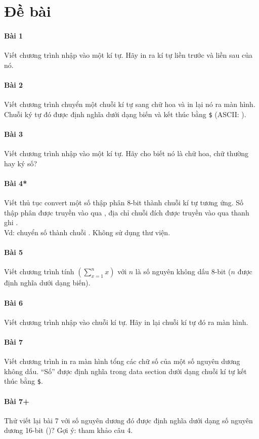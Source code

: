 \documentclass[main.tex]{subfiles}
\begin{document}
\newcommand{\textD}{\textcolor{OliveGreen}{\cd{Đ}}}
\newcommand{\textS}{\textcolor{red}{\cd{S}}}

\section{Đề bài}
\paragraph{Bài 1} Viết chương trình nhập vào một kí tự. Hãy in ra kí tự liền trước và liền sau của nó.
\paragraph{Bài 2} Viết chương trình chuyển một chuỗi kí tự sang chữ hoa và in lại nó ra màn hình. Chuỗi ký tự đó được định nghĩa dưới dạng biến và kết thúc bằng \verb#$# (ASCII: ).
\paragraph{Bài 3} Viết chương trình nhập vào một kí tự. Hãy cho biết nó là chữ hoa, chữ thường hay ký số?
\paragraph{Bài 4*} Viết thủ tục convert một số thập phân 8-bit thành chuỗi kí tự tương ứng. Số thập phân được truyền vào qua , địa chỉ chuỗi đích được truyền vào qua thanh ghi .\\Vd: chuyển số  thành chuỗi . Không sử dụng thư viện.
\paragraph{Bài 5} Viết chương trình tính $\left(\sum^{n}_{x=1}x\right)$ với $n$ là số nguyên không dấu 8-bit ($n$ được định nghĩa dưới dạng biến).
\paragraph{Bài 6} Viết chương trình nhập vào chuỗi kí tự. Hãy in lại chuỗi kí tự đó ra màn hình.
\paragraph{Bài 7} Viết chương trình in ra màn hình tổng các chữ số của một số nguyên dương không dấu. ``Số'' được định nghĩa trong data section dưới dạng chuỗi kí tự kết thúc bằng \verb#$#. 
\paragraph{Bài 7+} Thử viết lại bài 7 với số nguyên dương đó được định nghĩa dưới dạng số nguyên dương 16-bit ()? Gợi ý: tham khảo câu 4.
\end{document}
